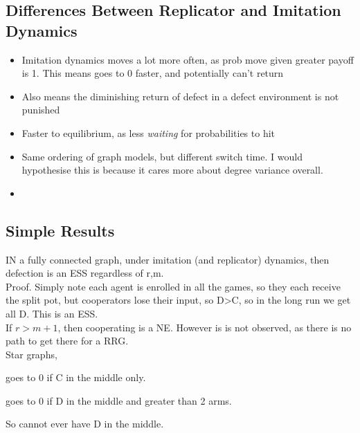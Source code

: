 \subsection{Differences Between Replicator and Imitation Dynamics}
\begin{itemize}
    \item Imitation dynamics moves a lot more often, as prob move given greater payoff is 1. This means goes to 0 faster, and potentially can't return
    \item Also means the diminishing return of defect in a defect environment is not punished
    \item Faster to equilibrium, as less \emph{waiting} for probabilities to hit
    \item Same ordering of graph models, but different switch time. I would hypothesise this is because it cares more about degree variance overall. 
    \item 
\end{itemize}
\subsection{Simple Results}
IN a fully connected graph, under imitation (and replicator) dynamics, then defection is an ESS regardless of r,m. \\
Proof. Simply note each agent is enrolled in all the games, so they each receive the split pot, but cooperators lose their input, so D>C, so in the long run we get all D. This is an ESS. \\

If $r>m+1$, then cooperating is a NE. However is is not observed, as there is no path to get there for a RRG. \\

Star graphs,

goes to 0 if C in the middle only.

goes to 0 if D in the middle and greater than 2 arms. 

So cannot ever have D in the middle. 

